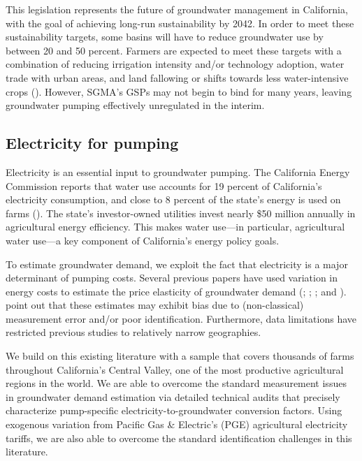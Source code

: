 This legislation represents the future of groundwater management in California, with the goal of achieving long-run sustainability by 2042. In order to meet these sustainability targets, some basins will have to reduce groundwater use by between 20 and 50 percent. Farmers are expected to meet these targets with a combination of reducing irrigation intensity and/or technology adoption, water trade with urban areas, and land fallowing or shifts towards less water-intensive crops (\textcite{bruno2019}). However, SGMA's GSPs may not begin to bind for many years, leaving groundwater pumping effectively unregulated in the interim.

\subsection{Electricity for pumping}
Electricity is an essential input to groundwater pumping. The California Energy Commission reports that water use accounts for 19 percent of California's electricity consumption, and close to 8 percent of the state's energy is used on farms (\textcite{cec2005}). The state's investor-owned utilities invest nearly \$50 million annually in agricultural energy efficiency. This makes water use---in particular, agricultural water use---a key component of California's energy policy goals.

To estimate groundwater demand, we exploit the fact that electricity is a major determinant of pumping costs. Several previous papers have used variation in energy costs to estimate the price elasticity of groundwater demand (\textcite{hendricks2012}; \textcite{pfeiffer2014}; \textcite{badiani2015}; and \textcite{mieno2017}). \textcite{mieno2017} point out that these estimates may exhibit bias due to (non-classical) measurement error and/or poor identification. Furthermore, data limitations have restricted previous studies to relatively narrow geographies.

We build on this existing literature with a sample that covers thousands of farms throughout California's Central Valley, one of the most productive agricultural regions in the world. We are able to overcome the standard measurement issues in groundwater demand estimation via detailed technical audits that precisely characterize pump-specific electricity-to-groundwater conversion factors. Using exogenous variation from Pacific Gas \& Electric's (PGE) agricultural electricity tariffs, we are also able to overcome the standard identification challenges in this literature.

